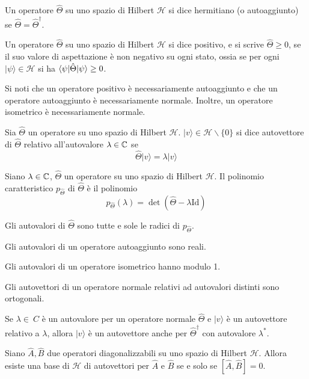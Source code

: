 \documentclass[a4paper, 11pt]{article}
\renewcommand{\H}{\mathcal{H}}
\newcommand{\id}{\mathrm{Id}}
\renewcommand{\ket}[1]{| #1\rangle}
\begin{document}
	\begin{definition}
	Un operatore $\hat{\Theta}$ su uno spazio di Hilbert $\H$ si dice hermitiano (o autoaggiunto) se $\hat{\Theta}=\hat{\Theta}^\dagger$.		
\end{definition}
	\begin{definition}
	Un operatore $\hat{\Theta}$ su uno spazio di Hilbert $\H$ si dice positivo, e si scrive $\hat{\Theta}\geq0$, se il suo valore di aspettazione è non negativo su ogni stato, ossia se per ogni $\ket{\psi}\in\H$ si ha $\langle\psi|\hat{\Theta}|\psi\rangle\geq0$.
\end{definition}
Si noti che un operatore positivo è necessariamente autoaggiunto e che un operatore autoaggiunto è necessariamente normale. Inoltre, un operatore isometrico è necessariamente normale.
\begin{definition}
	Sia $\hat{\Theta}$ un operatore su uno spazio di Hilbert $\H$. $\ket{v}\in\H\backslash\{0\}$ si dice autovettore di $\hat{\Theta}$ relativo all'autovalore $\lambda\in\mathbb{C}$ se
	\[\hat{\Theta}\ket{v}=\lambda\ket{v}\]
\end{definition}
\begin{definition}
	Siano $\lambda\in\mathbb{C}$, $\hat{\Theta}$ un operatore su uno spazio di Hilbert $\H$. Il polinomio caratteristico $p_{\hat{\Theta}}$ di $\hat{\Theta}$ è il polinomio
	\[p_{\hat{\Theta}}(\lambda)=\det(\hat{\Theta}-\lambda\id)\]
\end{definition}
\begin{theorem}
	Gli autovalori di $\hat{\Theta}$ sono tutte e sole le radici di $p_{\hat{\Theta}}$.
\end{theorem}
\begin{lemma}
	Gli autovalori di un operatore autoaggiunto sono reali.
\end{lemma}
\begin{lemma}
	Gli autovalori di un operatore isometrico hanno modulo 1.
\end{lemma}
\begin{lemma}
	Gli autovettori di un operatore normale relativi ad autovalori distinti sono ortogonali.
\end{lemma}
\begin{lemma}
	Se $\lambda\in\ C$ è un autovalore per un operatore normale $\hat{\Theta}$ e $\ket{v}$ è un autovettore relativo a $\lambda$, allora $\ket{v}$ è un autovettore anche per $\hat{\Theta}^\dagger$ con autovalore $\lambda^*$.
\end{lemma}
\begin{theorem}\label{commuta}
	Siano $\hat{A},\hat{B}$ due operatori diagonalizzabili su uno spazio di Hilbert $\H$. Allora esiste una base di $\H$ di autovettori per $\hat{A}$ e $\hat{B}$ se e solo se $[\hat{A},\hat{B}]=0$.
\end{theorem}
\end{document}
